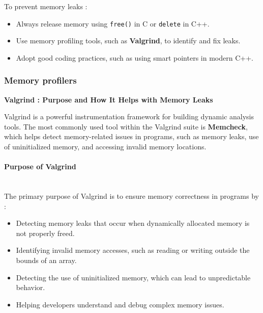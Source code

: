 \documentclass[12pt]{article}
\begin{document}
            To prevent memory leaks :
            \begin{itemize}
                \item Always release memory using \texttt{free()} in C or \texttt{delete} in C++.
                \item Use memory profiling tools, such as \textbf{Valgrind}, to identify and fix leaks.
                \item Adopt good coding practices, such as using smart pointers in modern C++.
            \end{itemize}




        \subsubsection{Memory profilers}

            \textbf{Valgrind : Purpose and How It Helps with Memory Leaks}
            
            Valgrind is a powerful instrumentation framework for building dynamic analysis tools. The most commonly used tool within the Valgrind suite is \textbf{Memcheck}, which helps detect memory-related issues in programs, such as memory leaks, use of uninitialized memory, and accessing invalid memory locations.
            
            \paragraph{Purpose of Valgrind}\\
            The primary purpose of Valgrind is to ensure memory correctness in programs by :
            \begin{itemize}
                \item Detecting memory leaks that occur when dynamically allocated memory is not properly freed.
                \item Identifying invalid memory accesses, such as reading or writing outside the bounds of an array.
                \item Detecting the use of uninitialized memory, which can lead to unpredictable behavior.
                \item Helping developers understand and debug complex memory issues.
            \end{itemize}
            
\end{document}
